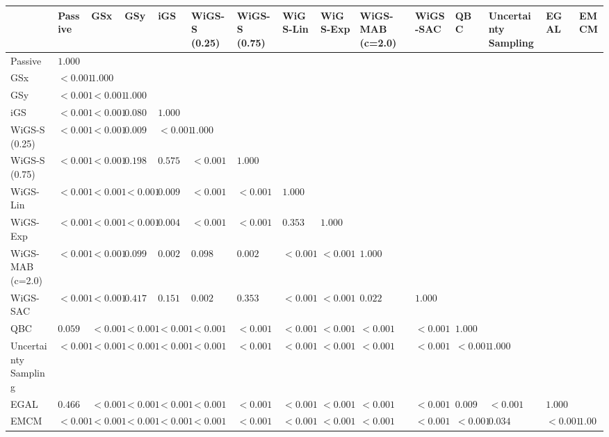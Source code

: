 \begin{tabular}{lllllllllllllll}
\toprule
 & Passive & GSx & GSy & iGS & WiGS-S (0.25) & WiGS-S (0.75) & WiGS-Lin & WiGS-Exp & WiGS-MAB (c=2.0) & WiGS-SAC & QBC & Uncertainty Sampling & EGAL & EMCM \\
\midrule
Passive & $1.000$ &  &  &  &  &  &  &  &  &  &  &  &  &  \\
GSx & $<0.001$ & $1.000$ &  &  &  &  &  &  &  &  &  &  &  &  \\
GSy & $<0.001$ & $<0.001$ & $1.000$ &  &  &  &  &  &  &  &  &  &  &  \\
iGS & $<0.001$ & $<0.001$ & $0.080$ & $1.000$ &  &  &  &  &  &  &  &  &  &  \\
WiGS-S (0.25) & $<0.001$ & $<0.001$ & $0.009$ & $<0.001$ & $1.000$ &  &  &  &  &  &  &  &  &  \\
WiGS-S (0.75) & $<0.001$ & $<0.001$ & $0.198$ & $0.575$ & $<0.001$ & $1.000$ &  &  &  &  &  &  &  &  \\
WiGS-Lin & $<0.001$ & $<0.001$ & $<0.001$ & $0.009$ & $<0.001$ & $<0.001$ & $1.000$ &  &  &  &  &  &  &  \\
WiGS-Exp & $<0.001$ & $<0.001$ & $<0.001$ & $0.004$ & $<0.001$ & $<0.001$ & $0.353$ & $1.000$ &  &  &  &  &  &  \\
WiGS-MAB (c=2.0) & $<0.001$ & $<0.001$ & $0.099$ & $0.002$ & $0.098$ & $0.002$ & $<0.001$ & $<0.001$ & $1.000$ &  &  &  &  &  \\
WiGS-SAC & $<0.001$ & $<0.001$ & $0.417$ & $0.151$ & $0.002$ & $0.353$ & $<0.001$ & $<0.001$ & $0.022$ & $1.000$ &  &  &  &  \\
QBC & $0.059$ & $<0.001$ & $<0.001$ & $<0.001$ & $<0.001$ & $<0.001$ & $<0.001$ & $<0.001$ & $<0.001$ & $<0.001$ & $1.000$ &  &  &  \\
Uncertainty Sampling & $<0.001$ & $<0.001$ & $<0.001$ & $<0.001$ & $<0.001$ & $<0.001$ & $<0.001$ & $<0.001$ & $<0.001$ & $<0.001$ & $<0.001$ & $1.000$ &  &  \\
EGAL & $0.466$ & $<0.001$ & $<0.001$ & $<0.001$ & $<0.001$ & $<0.001$ & $<0.001$ & $<0.001$ & $<0.001$ & $<0.001$ & $0.009$ & $<0.001$ & $1.000$ &  \\
EMCM & $<0.001$ & $<0.001$ & $<0.001$ & $<0.001$ & $<0.001$ & $<0.001$ & $<0.001$ & $<0.001$ & $<0.001$ & $<0.001$ & $<0.001$ & $0.034$ & $<0.001$ & $1.000$ \\
\bottomrule
\end{tabular}
